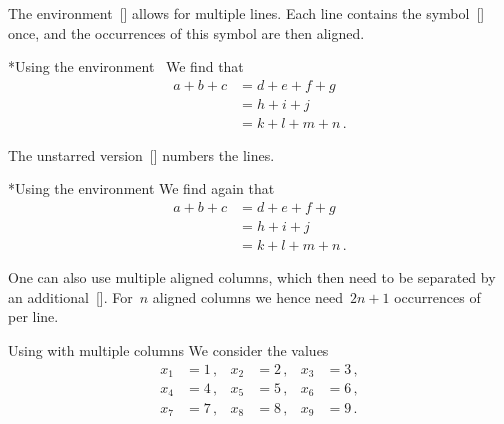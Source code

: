 The environment~[\envname] allows for multiple lines.
Each line contains the symbol~\inlinecode{\&}\massindex{\&}[\inlinecode] once, and the occurrences of this symbol are then aligned.
\begin{showlatex}*{Using the environment~}
We find that
\begin{align*}
  a + b + c
  &=
  d + e + f + g
  \\
  &=
  h + i + j
  \\
  &=
  k + l + m + n \,.
\end{align*}
\end{showlatex}
The unstarred version~[\envname] numbers the lines.
\begin{showlatex}*{Using the environment }
We find again that
\begin{align}
  a + b + c
  &=
  d + e + f + g
  \\
  &=
  h + i + j
  \\
  &=
  k + l + m + n \,.
\end{align}
\end{showlatex}
One can also use multiple aligned columns, which then need to be separated by an additional~\inlinecode{\&}\massindex{\&}[\inlinecode].
For~$n$ aligned columns we hence need~$2n+1$ occurrences of~\inlinecode{\&} per line.
\begin{showlatex}{Using  with multiple columns}
We consider the values
\begin{align*}
  x_1 &= 1 \,,  &   x_2 &= 2 \,,  &   x_3 &= 3 \,,  \\
  x_4 &= 4 \,,  &   x_5 &= 5 \,,  &   x_6 &= 6 \,,  \\
  x_7 &= 7 \,,  &   x_8 &= 8 \,,  &   x_9 &= 9 \,.
\end{align*}
\end{showlatex}

